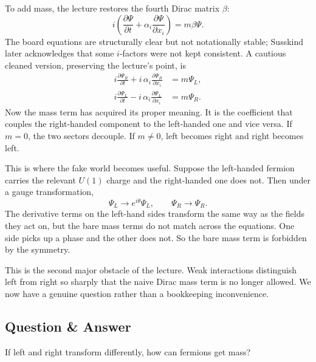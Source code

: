 To add mass, the lecture restores the fourth Dirac matrix \(\beta\):
\begin{equation}
i\left(\frac{\partial \Psi}{\partial t}+\alpha_i\frac{\partial \Psi}{\partial x_i}\right)=m\beta\Psi.
\end{equation}
The board equations are structurally clear but not notationally stable; Susskind later acknowledges that some \(i\)-factors were not kept consistent. A cautious cleaned version, preserving the lecture's point, is
\begin{align}
i\frac{\partial \Psi_R}{\partial t}+ i\,\alpha_i\frac{\partial \Psi_R}{\partial x_i} &= m\Psi_L,\\
i\frac{\partial \Psi_L}{\partial t}- i\,\alpha_i\frac{\partial \Psi_L}{\partial x_i} &= m\Psi_R.
\end{align}
Now the mass term has acquired its proper meaning. It is the coefficient that couples the right-handed component to the left-handed one and vice versa. If \(m=0\), the two sectors decouple. If \(m\neq 0\), left becomes right and right becomes left.

This is where the fake world becomes useful. Suppose the left-handed fermion carries the relevant \(U(1)\) charge and the right-handed one does not. Then under a gauge transformation,
\begin{equation}
\Psi_L \longrightarrow e^{i\theta}\Psi_L,
\qquad
\Psi_R \longrightarrow \Psi_R.
\end{equation}
The derivative terms on the left-hand sides transform the same way as the fields they act on, but the bare mass terms do not match across the equations. One side picks up a phase and the other does not. So the bare mass term is forbidden by the symmetry.

This is the second major obstacle of the lecture. Weak interactions distinguish left from right so sharply that the naive Dirac mass term is no longer allowed. We now have a genuine question rather than a bookkeeping inconvenience.

\subsection{Question \& Answer}

If left and right transform differently, how can fermions get mass?

